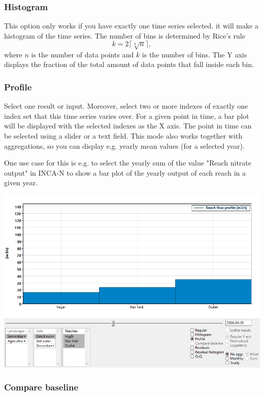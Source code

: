 \documentclass[11pt]{article}
\theoremstyle{definition}
\begin{document}
\subsubsection{Histogram}

This option only works if you have exactly one time series selected. it will make a histogram of the time series. The number of bins is determined by %
Rice's rule %
\[
k = 2\lceil\sqrt[3]{n}\rceil,
\]
where $n$ is the number of data points and $k$ is the number of bins. The Y axis displays the fraction of the total amount of data points that fall inside each bin.

\subsubsection{Profile}

Select one result or input. Moreover, select two or more indexes of exactly one index set that this time series varies over. For a given point in time, a bar plot will be displayed with the selected indexes as the X axis. The point in time can be selected using a slider or a text field. This mode also works together with aggregations, so you can display e.g. yearly mean values (for a selected year).

One use case for this is e.g. to select the yearly sum of the value "Reach nitrate output" in INCA-N to show a bar plot of the yearly output of each reach in a given year.

\begin{center}
\includegraphics[width=0.7\linewidth]{img/scr2}
\end{center}

\subsubsection{Compare baseline}
\end{document}
